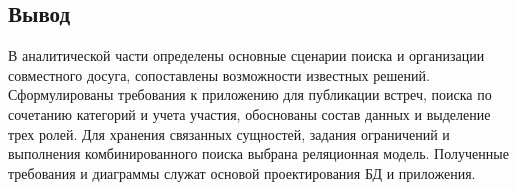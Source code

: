 \subsection*{Вывод}

В аналитической части определены основные сценарии поиска и организации совместного досуга, сопоставлены возможности известных решений. Сформулированы требования к приложению для публикации встреч, поиска по сочетанию категорий и учета участия, обоснованы состав данных и выделение трех ролей. Для хранения связанных сущностей, задания ограничений и выполнения комбинированного поиска выбрана реляционная модель. Полученные требования и диаграммы служат основой проектирования БД и приложения.
